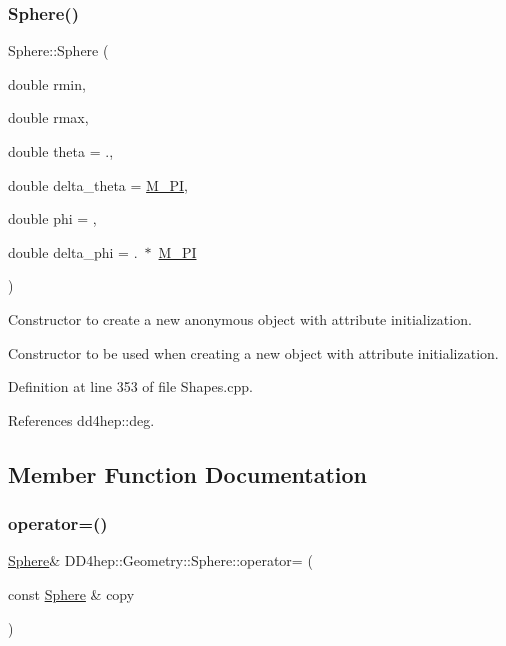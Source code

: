 \hypertarget{class_d_d4hep_1_1_geometry_1_1_sphere_a9e484ba0f6151d807e360d86d3a644b6}{}\label{class_d_d4hep_1_1_geometry_1_1_sphere_a9e484ba0f6151d807e360d86d3a644b6} 
\subsubsection{\texorpdfstring{Sphere()}{Sphere()}\hspace{0.1cm}{\footnotesize\ttfamily [5/5]}}
{\footnotesize\ttfamily Sphere\+::\+Sphere (\begin{DoxyParamCaption}\item[{double}]{rmin,  }\item[{double}]{rmax,  }\item[{double}]{theta = {.},  }\item[{double}]{delta\+\_\+theta = {\ttfamily \hyperlink{_x_m_l_elements_8h_ae71449b1cc6e6250b91f539153a7a0d3}{M\+\_\+\+PI}},  }\item[{double}]{phi = {},  }\item[{double}]{delta\+\_\+phi = {.~$\ast$~\hyperlink{_x_m_l_elements_8h_ae71449b1cc6e6250b91f539153a7a0d3}{M\+\_\+\+PI}} }\end{DoxyParamCaption})}



Constructor to create a new anonymous object with attribute initialization. 

Constructor to be used when creating a new object with attribute initialization. 

Definition at line 353 of file Shapes.\+cpp.



References dd4hep\+::deg.



\subsection{Member Function Documentation}
\hypertarget{class_d_d4hep_1_1_geometry_1_1_sphere_af5e712c2ced0fafb230be48a60b1bb12}{}\label{class_d_d4hep_1_1_geometry_1_1_sphere_af5e712c2ced0fafb230be48a60b1bb12} 
\subsubsection{\texorpdfstring{operator=()}{operator=()}}
{\footnotesize\ttfamily \hyperlink{class_d_d4hep_1_1_geometry_1_1_sphere}{Sphere}\& D\+D4hep\+::\+Geometry\+::\+Sphere\+::operator= (\begin{DoxyParamCaption}\item[{const \hyperlink{class_d_d4hep_1_1_geometry_1_1_sphere}{Sphere} \&}]{copy }\end{DoxyParamCaption})\hspace{0.3cm}{\ttfamily [default]}}



